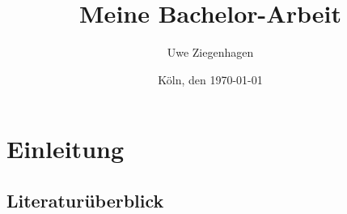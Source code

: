 \documentclass[12pt,ngerman,parskip=half,DIV=12]{scrbook}
\author{Uwe Ziegenhagen}
\title{Meine Bachelor-Arbeit}
\date{Köln, den \today}
\begin{document}
\maketitle

\tableofcontents

\listoffigures

\listoftables

\chapter{Einleitung}

\section{Literaturüberblick}

\blindtext[5]

\blindtext[5]

\blindtext[5]

\blindtext[5]

\blindtext[5]
\end{document}
